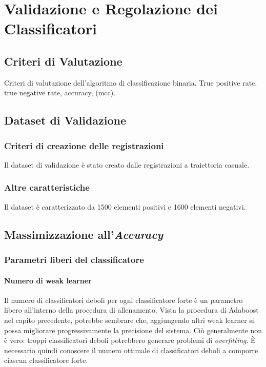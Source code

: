 
\chapter{Validazione e Regolazione dei Classificatori}
\label{chap:tuning}
    \section{Criteri di Valutazione}
    \label{sec:evaluation_criteria}
        Criteri di valutazione dell'algoritmo di classificazione binaria.
        True positive rate, true negative rate, accuracy, (mcc).

    \section{Dataset di Validazione}
    \label{sec:validation_dataset}
        \subsection{Criteri di creazione delle registrazioni}
            Il dataset di validazione è stato creato dalle registrazioni a traiettoria casuale.
        \subsection{Altre caratteristiche}
            Il dataset è caratterizzato da 1500 elementi positivi e 1600 elementi negativi.

    \section{Massimizzazione all'\emph{Accuracy}}
    \label{sec:accuracy_maximization}
        \subsection{Parametri liberi del classificatore}
            \subsubsection{Numero di weak learner}
                Il numero di classificatori deboli per ogni classificatore forte è un parametro libero all'interno della procedura di allenamento.
                Vista la procedura di Adaboost nel capito precedente, potrebbe sembrare che, aggiungendo altri weak learner si possa migliorare progressivamente la precisione del sistema.
                Ciò generalmente non è vero: troppi classificatori deboli potrebbero generare problemi di \emph{overfitting}.
                È necessario quindi conoscere il numero ottimale di classificatori deboli a comporre ciascun classificatore forte.

